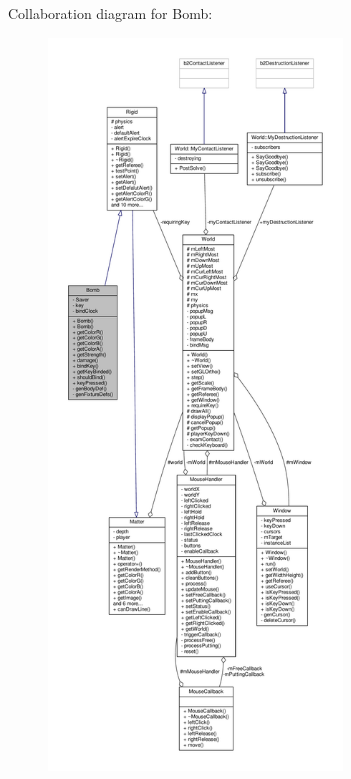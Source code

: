 Collaboration diagram for Bomb\+:
\nopagebreak
\begin{figure}[H]
\begin{center}
\leavevmode
\includegraphics[height=550pt]{classBomb__coll__graph}
\end{center}
\end{figure}

